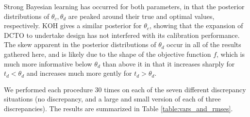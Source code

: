 \documentclass[12pt]{article}
\begin{document}
%
Strong Bayesian learning has occurred for both parameters, in that the posterior distributions of $\theta_c,\theta_d$ are peaked around their true and optimal values, respectively.
%
KOH gives a similar posterior for $\theta_c$, showing that the expansion of DCTO to undertake design has not interfered with its calibration performance.
%
The skew apparent in the posterior distributions of $\theta_d$ occur in all of the results gathered here, and is likely due to the shape of the objective function $f$, which is much more informative below $\theta_d$ than above it in that it increases sharply for $t_d<\theta_d$ and increases much more gently for $t_d>\theta_d$.
%

%
We performed each procedure 30 times on each of the seven different discrepancy situations (no discrepancy, and a large and small version of each of three discrepancies).
%
The results are summarized in Table \ref{table:vars_and_rmses}.
%
\end{document}
